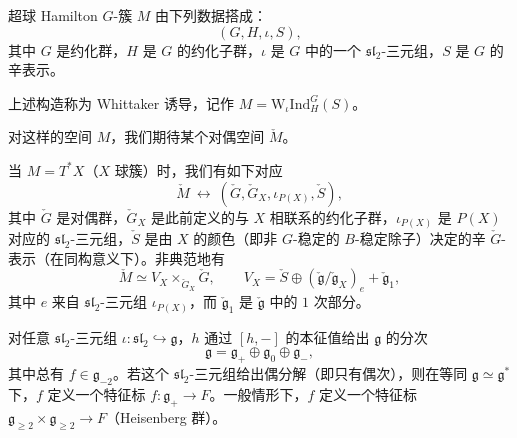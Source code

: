 \begin{thm}
[超球簇的结构定理]
超球 Hamilton $G$-簇 $M$ 由下列数据搭成：
\[
  (G,H,\iota,S),
\]
其中 $G$ 是约化群，$H$ 是 $G$ 的约化子群，$\iota$ 是 $G$ 中的一个 $\mathfrak{sl}_2$-三元组，$S$ 是 $G$ 的辛表示。
\end{thm}

上述构造称为 Whittaker 诱导，记作 $M=\mathrm{W}_\iota\mathrm{Ind}_H^G(S)$。

对这样的空间 $M$，我们期待某个对偶空间 $\check M$。

当 $M=T^*X$（$X$ 球簇）时，我们有如下对应
\[
  \check M\ \longleftrightarrow\ (\check G,\check G_X,\iota_{P(X)},\check S),
\]
其中 $\check G$ 是对偶群，$\check G_X$ 是此前定义的与 $X$ 相联系的约化子群，$\iota_{P(X)}$ 是 $P(X)$ 对应的 $\mathfrak{sl}_2$-三元组，$\check S$ 是由 $X$ 的颜色（即非 $G$-稳定的 $B$-稳定除子）决定的辛 $\check G$-表示（在同构意义下）。非典范地有
\[
  \check M\simeq V_X\times_{\check G_X}\check G,\qquad V_X=\check S\oplus(\check{\mathfrak g}/\check{\mathfrak g}_X)_e+\check{\mathfrak g}_1,
\]
其中 $e$ 来自 $\mathfrak{sl}_2$-三元组 $\iota_{P(X)}$，而 $\check{\mathfrak g}_1$ 是 $\check{\mathfrak g}$ 中的 $1$ 次部分。

对任意 $\mathfrak{sl}_2$-三元组 $\iota:\mathfrak{sl}_2\hookrightarrow\mathfrak g$，$h$ 通过 $[h,-]$ 的本征值给出 $\mathfrak g$ 的分次
\[
  \mathfrak g=\mathfrak g_+\oplus\mathfrak g_0\oplus\mathfrak g_-,
\]
其中总有 $f\in\mathfrak g_{-2}$。若这个 $\mathfrak{sl}_2$-三元组给出偶分解（即只有偶次），则在等同 $\mathfrak g\simeq\mathfrak g^*$ 下，$f$ 定义一个特征标 $f:\mathfrak g_+\to F$。一般情形下，$f$ 定义一个特征标 $\mathfrak g_{\ge2}\times\mathfrak g_{\ge2}\to F$（Heisenberg 群）。
